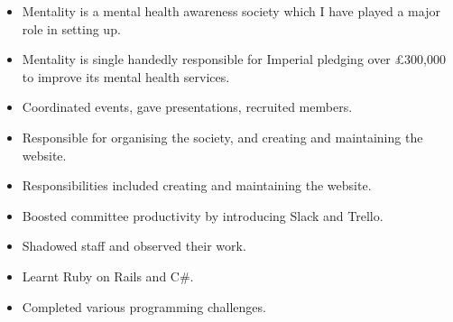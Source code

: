 \documentclass{jcgcv}
\begin{document}
\begin{column}
\begin{itemize}
  \item Mentality is a mental health awareness society which I have played a major role in setting up.
  \item Mentality is single handedly responsible for Imperial pledging over \pounds300,000 to improve its mental health services.
  \item Coordinated events, gave presentations, recruited members.
  \item Responsible for organising the society, and creating and maintaining the website.
\end{itemize}

\begin{itemize}
  \item Responsibilities included creating and maintaining the website.
  \item Boosted committee productivity by introducing Slack and Trello.
\end{itemize}

\begin{itemize}
  \item Shadowed staff and observed their work.
  \item Learnt Ruby on Rails and C\#.
  \item Completed various programming challenges.
\end{itemize}



\end{column}%
\end{document}
